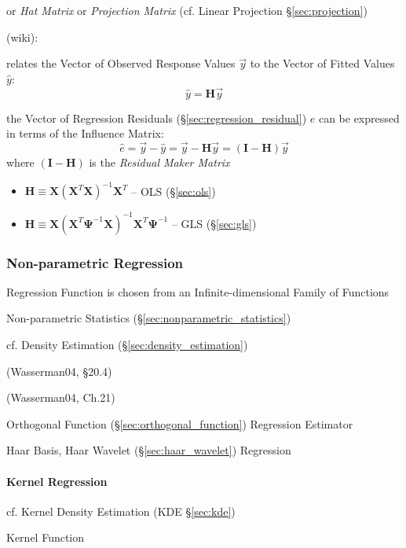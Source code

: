 or \emph{Hat Matrix} or \emph{Projection Matrix} (cf.
Linear Projection \S\ref{sec:projection})

(wiki):

relates the Vector of Observed Response Values $\vec{y}$ to the Vector of Fitted
Values $\hat{y}$:
\[
  \hat{y} = \mathbf{H}\vec{y}
\]

the Vector of Regression Residuals (\S\ref{sec:regression_residual}) $\hat{e}$
can be expressed in terms of the Influence Matrix:
\[
  \hat{e} = \vec{y} - \hat{y} = \vec{y} - \mathbf{H}\vec{y} =
    (\mathbf{I} - \mathbf{H})\vec{y}
\]
where $(\mathbf{I} - \mathbf{H})$ is the \emph{Residual Maker Matrix}

\begin{itemize}
  \item $\mathbf{H} \equiv \mathbf{X}(\mathbf{X}^T\mathbf{X})^{-1}\mathbf{X}^T$
    -- OLS (\S\ref{sec:ols})
  \item $\mathbf{H} \equiv \mathbf{X}
    (\mathbf{X}^T\mathbf{\Psi}^{-1}\mathbf{X})^{-1}
    \mathbf{X}^T\mathbf{\Psi}^{-1}$
    -- GLS (\S\ref{sec:gls})
\end{itemize}



\subsubsection{Non-parametric Regression}\label{sec:nonparametric_regression}

Regression Function is chosen from an Infinite-dimensional Family of Functions

Non-parametric Statistics (\S\ref{sec:nonparametric_statistics})

\fist cf. Density Estimation (\S\ref{sec:density_estimation})

(Wasserman04, \S20.4)

(Wasserman04, Ch.21)

Orthogonal Function (\S\ref{sec:orthogonal_function}) Regression Estimator

Haar Basis, Haar Wavelet (\S\ref{sec:haar_wavelet}) Regression



\paragraph{Kernel Regression}\label{sec:kernel_regression}\hfill

cf. Kernel Density Estimation (KDE \S\ref{sec:kde})

Kernel Function

